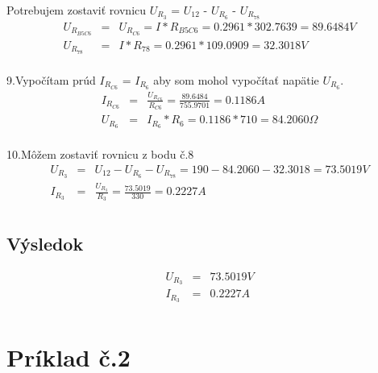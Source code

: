 \documentclass[a4paper,oneside,12pt]{article}
\begin{document}
Potrebujem zostaviť rovnicu $U_{R_{3}}$ = $U_{12}$ - $U_{R_{6}}$ - $U_{R_{78}}$
\begin{eqnarray*}
	U_{R_{B5C6}} &= & U_{R_{C6}} = I * R_{B5C6} = 0.2961 * 302.7639 = 89.6484 V \\
	U_{R_{78}} &= & I * R_{78} = 0.2961 * 109.0909 = 32.3018 V \\
\end{eqnarray*}


9.Vypočítam prúd $I_{R_{C6}}$ = $I_{R_{6}}$ aby som mohol vypočítať napätie $U_{R_{6}}$.
\begin{eqnarray*}
	I_{R_{C6}} &= &\frac{U_{R_{C6}}}{R_{C6}} = \frac{89.6484}{755.9701} = 0.1186 A \\
	U_{R_{6}} &= & I_{R_{6}} * R_{6} = 0.1186 * 710 = 84.2060 \Omega\\
\end{eqnarray*}


10.Môžem zostaviť rovnicu z bodu č.8
\begin{eqnarray*}
	U_{R_{3}} &= & U_{12} - U_{R_{6}} - U_{R_{78}} = 190 - 84.2060 - 32.3018 = 73.5019 V \\
	I_{R_{3}} &= & \frac{U_{R_{3}}}{R_{3}} = \frac{73.5019}{330} = 0.2227 A \\ 
\end{eqnarray*}

\maketitle
\subsection{Výsledok}

\begin{eqnarray*}
	U_{R_{3}} &= & 73.5019 V \\
	I_{R_{3}} &= & 0.2227 A \\ 
\end{eqnarray*}

\newpage

\maketitle
\section{Príklad č.2}

\maketitle
\end{document}
